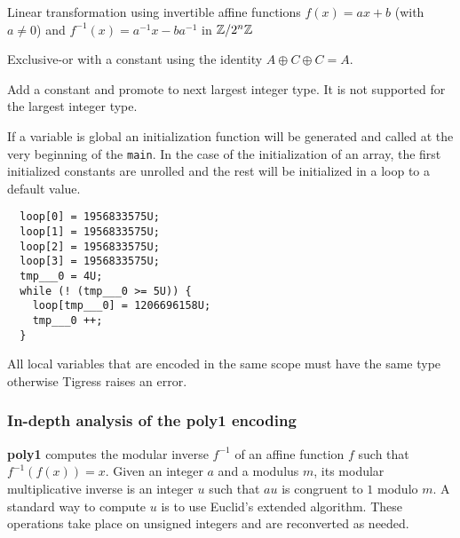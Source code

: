 \documentclass{projectreport}
\begin{document}
\begin{description}[font=\sffamily\bfseries, leftmargin=1cm, style=nextline]
  \item[poly1]
    Linear transformation using invertible affine functions $f(x) = ax +b$ (with $a \neq  0$) and $f^{-1}(x) = a^{-1}x - ba^{-1}$ in $\mathbb Z/2^n\mathbb Z$
  \item[xor]
    Exclusive-or with a constant using the identity $A \oplus C \oplus C = A$.
  \item[add]
    Add a constant and promote to next largest integer type. It is not supported for the largest integer type. 
\end{description}

If a variable is global an initialization function will be generated and called at the very beginning of the \verb|main|. In the case of the initialization of an array, the first initialized constants are unrolled and the rest will be initialized in a loop to a default value. 

\begin{verbatim}
  loop[0] = 1956833575U;
  loop[1] = 1956833575U;
  loop[2] = 1956833575U;
  loop[3] = 1956833575U;
  tmp___0 = 4U;
  while (! (tmp___0 >= 5U)) {
    loop[tmp___0] = 1206696158U;
    tmp___0 ++;
  }
\end{verbatim}

All local variables that are encoded in the same scope must have the same type otherwise Tigress raises an error.

\subsubsection{In-depth analysis of the poly1 encoding}

\textbf{\textsf{poly1}} computes the modular inverse $f^{-1}$ of an affine function $f$ such that $f^{-1}(f(x)) = x$. Given an integer $a$ and a modulus $m$, its modular multiplicative inverse
is an integer $u$ such that $au$ is congruent to $1$ modulo $m$. A standard way to compute $u$ is to use Euclid's extended algorithm. These operations take place on unsigned integers and are reconverted as needed.
\end{document}
